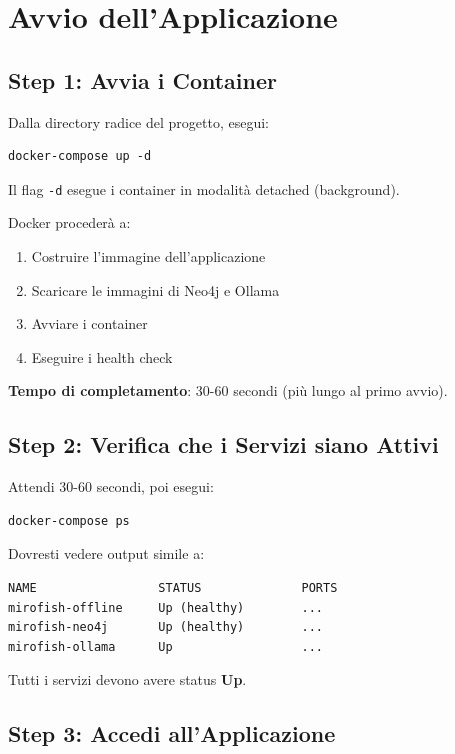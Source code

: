 \section{Avvio dell'Applicazione}

\subsection{Step 1: Avvia i Container}

Dalla directory radice del progetto, esegui:

\begin{lstlisting}
docker-compose up -d
\end{lstlisting}

Il flag \texttt{-d} esegue i container in modalità detached (background).

Docker procederà a:
\begin{enumerate}
    \item Costruire l'immagine dell'applicazione
    \item Scaricare le immagini di Neo4j e Ollama
    \item Avviare i container
    \item Eseguire i health check
\end{enumerate}

\textbf{Tempo di completamento}: 30-60 secondi (più lungo al primo avvio).

\subsection{Step 2: Verifica che i Servizi siano Attivi}

Attendi 30-60 secondi, poi esegui:

\begin{lstlisting}
docker-compose ps
\end{lstlisting}

Dovresti vedere output simile a:

\begin{lstlisting}
NAME                 STATUS              PORTS
mirofish-offline     Up (healthy)        ...
mirofish-neo4j       Up (healthy)        ...
mirofish-ollama      Up                  ...
\end{lstlisting}

Tutti i servizi devono avere status \textbf{Up}.

\subsection{Step 3: Accedi all'Applicazione}


